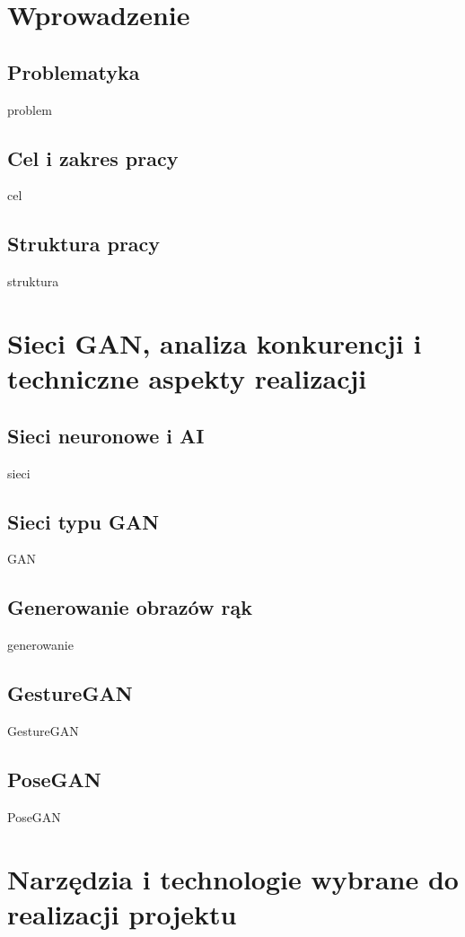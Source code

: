 \documentclass[12pt]{article}
\begin{document}
\begin{sloppypar}


\tableofcontents
\newpage

\section{Wprowadzenie}
{
  \subsection{Problematyka}
  {
    problem
  }
  \subsection{Cel i zakres pracy}
  {
    cel
  }
  \subsection{Struktura pracy}
  {
    struktura
  }
}

\section{Sieci GAN, analiza konkurencji i techniczne aspekty realizacji}
{
  \subsection{Sieci neuronowe i AI}
  {
    sieci
  }
  \subsection{Sieci typu GAN}
  {
    GAN
  }
  \subsection{Generowanie obrazów rąk}
  {
    generowanie
  }
  \subsection{GestureGAN}
  {
    GestureGAN
  }
  \subsection{PoseGAN}
  {
    PoseGAN
  }
}

\section{Narzędzia i technologie wybrane do realizacji projektu}
{
}
\end{sloppypar}
\end{document}
